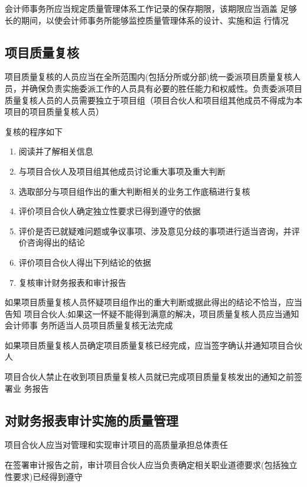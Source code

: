 \documentclass[UTF8,12pt]{ctexart}
\numberwithin{equation}{section} %
\numberwithin{figure}{section}
\numberwithin{table}{section}
\begin{document}
	会计师事务所应当规定质量管理体系工作记录的保存期限，该期限应当涵盖 足够长的期间，以使会计师事务所能够监控质量管理体系的设计、实施和运 行情况
	
	\subsection{项目质量复核}
	项目质量复核的人员应当在全所范围内(包括分所或分部)统一委派项目质量复核人员，并确保负责实施委派工作的人员具有必要的胜任能力和权威性。负责委派项目质量复核人员的人员需要独立于项目组（项目合伙人和项目组其他成员不得成为本项目的项目质量复核人员）
	
	复核的程序如下
	\begin{enumerate}
		\item 阅读并了解相关信息
		
		\item 与项目合伙人及项目组其他成员讨论重大事项及重大判断
		
		\item 选取部分与项目组作出的重大判断相关的业务工作底稿进行复核
		
		\item 评价项目合伙人确定独立性要求已得到遵守的依据
		
		\item 评价是否已就疑难问题或争议事项、涉及意见分歧的事项进行适当咨询，并评价咨询得出的结论
		
		\item 评价项目合伙人得出下列结论的依据
		
		\item 复核审计财务报表和审计报告
	\end{enumerate}
	
	如果项目质量复核人员怀疑项目组作出的重大判断或据此得出的结论不恰当，应当告知 项目合伙人;如果这一怀疑不能得到满意的解决，项目质量复核人员应当通知会计师事 务所适当人员项目质量复核无法完成 
	
	如果项目质量复核人员确定项目质量复核已经完成，应当签字确认并通知项目合伙人 
	
	项目合伙人禁止在收到项目质量复核人员就已完成项目质量复核发出的通知之前签署业 务报告
	
	\subsection{对财务报表审计实施的质量管理}
	项目合伙人应当对管理和实现审计项目的高质量承担总体责任
	
	在签署审计报告之前，审计项目合伙人应当负责确定相关职业道德要求(包括独立性要求)已经得到遵守
	
\end{document}
